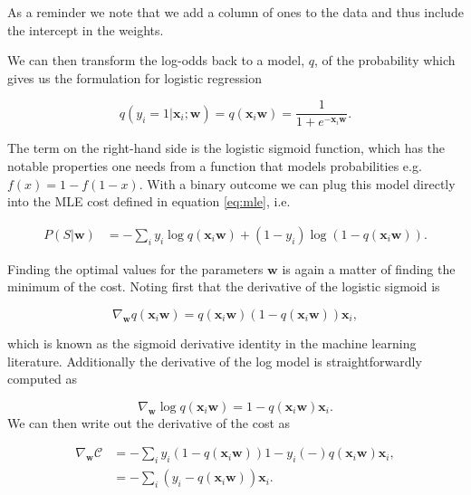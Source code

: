 \noindent As a reminder we note that we add a column of ones to the data and thus include the intercept in the weights. 

We can then transform the log-odds back to a model, $q$, of the probability which gives us the formulation for logistic regression 

\begin{equation}
q(y_i=1 | \boldsymbol{x}_i; \boldsymbol{w})= q(\boldsymbol{x}_i\boldsymbol{w}) = \frac{1}{1 + e^{-\boldsymbol{x}_i \boldsymbol{w}}}.
\end{equation} 

\noindent The term on the right-hand side is the logistic sigmoid function, which has the notable properties one needs from a function that models probabilities e.g. $f(x) = 1-f(1-x)$. With a binary outcome we can plug this model directly into the MLE cost defined in equation \ref{eq:mle}, i.e. 

\begin{align}\label{eq:mle_lr}
P(S|\boldsymbol{w}) &=  - \sum_i y_i\log q (\boldsymbol{x}_i\boldsymbol{w}) + (1-y_i)\log\left(1-q(\boldsymbol{x}_i\boldsymbol{w})\right).
\end{align}

\noindent Finding the optimal values for the parameters $\boldsymbol{w}$ is again a matter of finding the minimum of the cost. Noting first that the derivative of the logistic sigmoid is 

\begin{equation}
\nabla_{\boldsymbol{w}} q(\boldsymbol{x}_i \boldsymbol{w}) = q(\boldsymbol{x}_i \boldsymbol{w}) (1 - q(\boldsymbol{x}_i \boldsymbol{w}))\boldsymbol{x}_i,
\end{equation}

\noindent which is known as the sigmoid derivative identity in the machine learning literature. Additionally the derivative of the log model is straightforwardly computed as 

\begin{equation}
\nabla_{\boldsymbol{w}} \log q(\boldsymbol{x}_i \boldsymbol{w}) = 1- q(\boldsymbol{x}_i \boldsymbol{w})\boldsymbol{x}_i.
\end{equation}
 We can then write out the derivative of the cost as 

\begin{align}
\nabla_{\boldsymbol{w}} \mathcal{C} &= - \sum_i y_i (1 - q(\boldsymbol{x}_i \boldsymbol{w})) 1-y_i (-) q(\boldsymbol{x}_i \boldsymbol{w})\boldsymbol{x}_i, \\
&= - \sum_i \left(y_i -  q(\boldsymbol{x}_i \boldsymbol{w})\right)\boldsymbol{x}_i.
\end{align}

